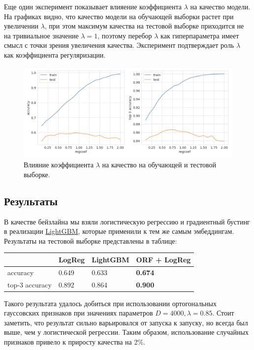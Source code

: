 \documentclass{article}
\newcommand{\bibref}[3]{#2\hyperlink{#1}{\color{blue}#3}}
\begin{document}
Еще один эксперимент показывает влияение коэффициента $\lambda$ на качество модели. На графиках видно, что качество модели на обучающей выборки растет при увеличении $\lambda$, при этом максимум качества на тестовой выборке приходится не на тривиальное значение $\lambda=1$, поэтому перебор $\lambda$ как гиперпараметра имеет смысл с точки зрения увеличения качества. Эксперимент подтверждает роль $\lambda$ как коэффициента регуляризации.

\begin{figure}[H]
    \centering
    \includegraphics[width=14cm]{images/regcoef.png}
    \caption{Влияние коэффициента $\lambda$ на качество на обучающей и тестовой выборке.}
    \label{fig:my_label}
\end{figure}{}

\subsection{Результаты}

В качестве бейзлайна мы взяли логистическую регрессию и градиентный бустинг в реализации \bibref{lightgbm}{}{LightGBM}, которые применили к тем же самым эмбеддингам. Результаты на тестовой выборке представлены в таблице:

\begin{table}[H]
\centering

\begin{tabular}{M{2.5cm}|M{2.5cm}M{2.5cm}M{2.5cm}}
     & LogReg & LightGBM & ORF + LogReg \\
    \hline
    accuracy & 0.649 & 0.633 & \textbf{0.674} \\
    top-3 accuracy & 0.892 & 0.864 & \textbf{0.900} \\
\end{tabular}

\label{tab:my_label}
\end{table}

\noindent
Такого результата удалось добиться при использовании ортогональных гауссовских признаков при значениях параметров $D=4000, \lambda=0.85$. Стоит заметить, что результат сильно варьировался от запуска к запуску, но всегда был выше, чем у логистической регрессии. Таким образом, использование случайных признаков привело к приросту качества на 2\%.
\end{document}
